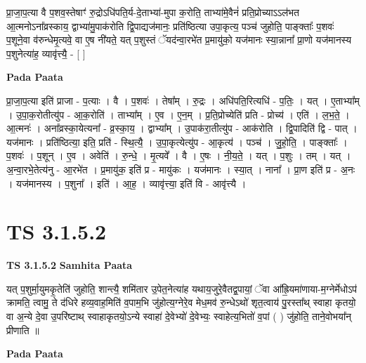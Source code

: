 \documentclass[17pt]{extarticle}
\begin{document}
प्रा॒जा॒प॒त्या वै प॒शव॒स्तेषाꣳ॑ रु॒द्रोऽधि॑पति॒र्य-दे॒ताभ्या॑-मुपा क॒रोति॒ ताभ्या॑मे॒वैनं॑ प्रति॒प्रोच्याऽऽल॑भत आ॒त्मनोऽना᳚व्रस्काय॒ द्वाभ्या॑मु॒पाक॑रोति द्वि॒पाद्यज॑मानः॒ प्रति॑ष्ठित्या उपा॒कृत्य॒ पञ्च॑ जुहोति॒ पाङ्क्ताः᳚ प॒शवः॑ प॒शूने॒वा व॑रुन्धेमृ॒त्यवे॒ वा ए॒ष नी॑यते॒ यत् प॒शुस्तं ॅयद॑न्वा॒रभे॑त प्र॒मायु॑को॒ यज॑मानः स्या॒न्नाना᳚ प्रा॒णो यज॑मानस्य प॒शुनेत्या॑ह॒ व्यावृ॑त्त्यै॒ - [  ] \newline

\textbf{Pada Paata} \newline

प्रा॒जा॒प॒त्या इति॑ प्राजा - प॒त्याः । वै । प॒शवः॑ । तेषा᳚म् । रु॒द्रः । अधि॑पति॒रित्यधि॑ - प॒तिः॒ । यत् । ए॒ताभ्या᳚म् । उ॒पा॒क॒रोतीत्यु॑प - आ॒क॒रोति॑ । ताभ्या᳚म् । ए॒व । ए॒न॒म् । प्र॒ति॒प्रोच्येति॑ प्रति - प्रोच्य॑ । एति॑ । ल॒भ॒ते॒ । आ॒त्मनः॑ । अना᳚व्रस्का॒येत्यना᳚ - व्र॒स्का॒य॒ । द्वाभ्या᳚म् । उ॒पाक॑रा॒तीत्यु॑प - आक॑रोति । द्वि॒पादिति॑ द्वि - पात् । यज॑मानः । प्रति॑ष्ठित्या॒ इति॒ प्रति॑ - स्थि॒त्यै॒ । उ॒पा॒कृत्येत्यु॑प - आ॒कृत्य॑ । पञ्च॑ । जु॒हो॒ति॒ । पाङ्क्ताः᳚ । प॒शवः॑ । प॒शून् । ए॒व । अवेति॑ । रु॒न्धे॒ । मृ॒त्यवे᳚ । वै । ए॒षः । नी॒य॒ते॒ । यत् । प॒शुः । तम् । यत् । अ॒न्वा॒रभे॒तेत्य॑नु - आ॒रभे॑त । प्र॒मायु॑क॒ इति॑ प्र - मायु॑कः । यज॑मानः । स्या॒त् । नाना᳚ । प्रा॒ण इति॑ प्र - अ॒नः । यज॑मानस्य । प॒शुना᳚ । इति॑ । आ॒ह॒ । व्यावृ॑त्त्या॒ इति॑ वि - आवृ॑त्त्यै ।  \newline





\section{ TS 3.1.5.2 }

\textbf{TS 3.1.5.2 } \newline
\textbf{Samhita Paata} \newline

यत् प॒शुर्मा॒युमकृ॒तेति॑ जुहोति॒ शान्त्यै॒ शमि॑तार उ॒पेत॒नेत्या॑ह यथाय॒जुरे॒वैतद्व॒पायां॒ ॅवा आ᳚ह्रि॒यमा॑णाया-म॒ग्नेर्मेधोऽप॑ क्रामति॒ त्वामु॒ ते द॑धिरे हव्य॒वाह॒मिति॑ व॒पाम॒भि जु॑होत्य॒ग्नेरे॒व मेध॒मव॑ रु॒न्धेऽथो॑ शृत॒त्वाय॑ पु॒रस्ता᳚थ् स्वाहा कृतयो॒ वा अ॒न्ये दे॒वा उ॒परि॑ष्टाथ् स्वाहाकृतयो॒ऽन्ये स्वाहा॑ दे॒वेभ्यो॑ दे॒वेभ्यः॒ स्वाहेत्य॒भितो॑ व॒पां ( ) जु॑होति॒ ताने॒वोभया᳚न् प्रीणाति ॥ \newline

\textbf{Pada Paata} \newline
\end{document}
